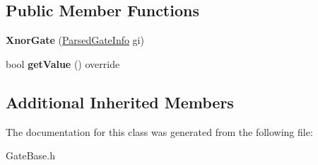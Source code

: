 \subsection*{Public Member Functions}
\begin{DoxyCompactItemize}
\item 
{\bfseries Xnor\+Gate} (\hyperlink{structParsedGateInfo}{Parsed\+Gate\+Info} gi)\hypertarget{classXnorGate_a8fdae6109d50e3ede521261d100dd0f1}{}\label{classXnorGate_a8fdae6109d50e3ede521261d100dd0f1}

\item 
bool {\bfseries get\+Value} () override\hypertarget{classXnorGate_aaf83cf68772ffbc963853acd60571f06}{}\label{classXnorGate_aaf83cf68772ffbc963853acd60571f06}

\end{DoxyCompactItemize}
\subsection*{Additional Inherited Members}


The documentation for this class was generated from the following file\+:\begin{DoxyCompactItemize}
\item 
Gate\+Base.\+h\end{DoxyCompactItemize}
